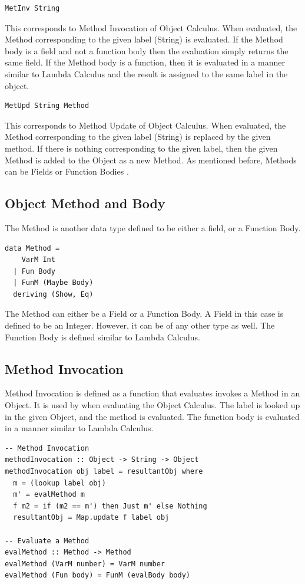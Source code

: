 \documentclass[10pt,twocolumn]{article}
\begin{document}
\begin{lstlisting}
MetInv String
\end{lstlisting}
This corresponds to Method Invocation of Object Calculus. When evaluated, the Method corresponding to the given label (String) is evaluated. If the Method body is a field and  not a function body then the evaluation simply returns the same field. If the Method body is a function, then it is evaluated in a manner similar to Lambda Calculus and the result is assigned to the same label in the object. 

\begin{lstlisting}
MetUpd String Method
\end{lstlisting}
This corresponds to Method Update of Object Calculus. When evaluated, the Method corresponding to the given label (String) is replaced by the given method. If there is nothing corresponding to the given label, then the given Method is added to the Object as a new Method. As mentioned before, Methods can be Fields or Function Bodies \cite{ex1}. 

\subsection{Object Method and Body}
The Method is another data type defined to be either a field, or a Function Body. 
\begin{lstlisting}
data Method =
    VarM Int
  | Fun Body
  | FunM (Maybe Body)
  deriving (Show, Eq)
\end{lstlisting}
The Method can either be a Field or a Function Body. A Field in this case is defined to be an Integer. However, it can be of any other type as well. The Function Body is defined similar to Lambda Calculus.  

\subsection{Method Invocation}
Method Invocation is defined as a function that evaluates invokes a Method in an Object. It is used by when evaluating the Object Calculus. The label is looked up in the given Object, and the method is evaluated. The function body is evaluated in a manner similar to Lambda Calculus. 
\begin{lstlisting}
-- Method Invocation
methodInvocation :: Object -> String -> Object
methodInvocation obj label = resultantObj where
  m = (lookup label obj)
  m' = evalMethod m
  f m2 = if (m2 == m') then Just m' else Nothing
  resultantObj = Map.update f label obj
  
-- Evaluate a Method
evalMethod :: Method -> Method
evalMethod (VarM number) = VarM number
evalMethod (Fun body) = FunM (evalBody body)
\end{lstlisting}
\end{document}
